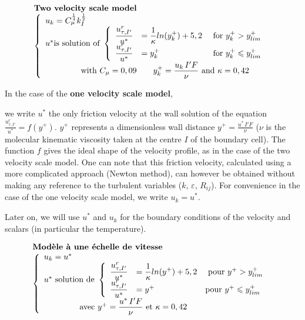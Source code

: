 \begin{equation}\label{Base_Clptur_Eq_Mod_'2ech_Vit}
\begin{array}{l}
\text{\bf Two velocity scale model}\\
\left\{\begin{array}{l}
u_k = C_\mu^\frac{1}{4}k_I^\frac{1}{2}\\
u^* \text{is solution of }
\left\{\begin{array}{lll}
\displaystyle\frac{u^r_{\tau,I'}}{u^*} &=
\displaystyle\frac{1}{\kappa}ln(y^+_k)+5,2 &\text { for }y^+_k>y^+_{lim}\\
\displaystyle\frac{u^r_{\tau,I'}}{u^*} &= y^+_k                &\text { for }
y^+_k \leqslant y^+_{lim}
\end{array}\right.    \\
\qquad\qquad
\text{   with   } C_\mu =0,09\qquad y^+_k=\displaystyle\frac{u_k\,I'F}{\nu}
                                                      \text{  and }\kappa = 0,42
\end{array}\right.
\end{array}
\end{equation}



In the case of the {\bf one velocity scale model},

we write $u^*$ the only
friction velocity at the wall solution of the equation
$\displaystyle\frac{u^r_{\tau,I'}}{u^*} = f(y^+)$.
$y^+$  represents a dimensionless wall distance
$y^+=\displaystyle\frac{u^*\,I'F}{\nu}$ ($\nu$ is the molecular kinematic viscosity
taken at the centre $I$ of the boundary cell).
The function $f$ gives the ideal shape of the velocity profile, as in the case of the two velocity scale model. One can note that this friction velocity, calculated using a more complicated approach (Newton method), can however be obtained without making any reference to the turbulent variables ($k$, $\varepsilon$, $R_{ij}$). For convenience in the case of the one velocity scale model, we write $u_k=u^*$.

Later on, we will use $u^*$ and $u_k$ for the boundary conditions of the velocity and scalars (in particular the temperature).

\begin{equation}
\begin{array}{l}
\text{\bf Mod\`ele \`a une \'echelle de vitesse}\\
\left\{\begin{array}{l}
u_k = u^*\\
u^* \text{ solution de } \left\{\begin{array}{lll}
\displaystyle\frac{u^r_{\tau,I'}}{u^*} &=
\displaystyle\frac{1}{\kappa}ln(y^+)+5,2 &\text { pour }y^+>y^+_{lim}\\
\displaystyle\frac{u^r_{\tau,I'}}{u^*} &= y^+                         &\text
{pour } y^+\leqslant y^+_{lim}
\end{array}\right.\\
\qquad\qquad\text{   avec   } y^+=\displaystyle\frac{u^*\,I'F}{\nu}
                                                      \text{  et }\kappa=0,42
\end{array}\right.
\end{array}
\end{equation}


